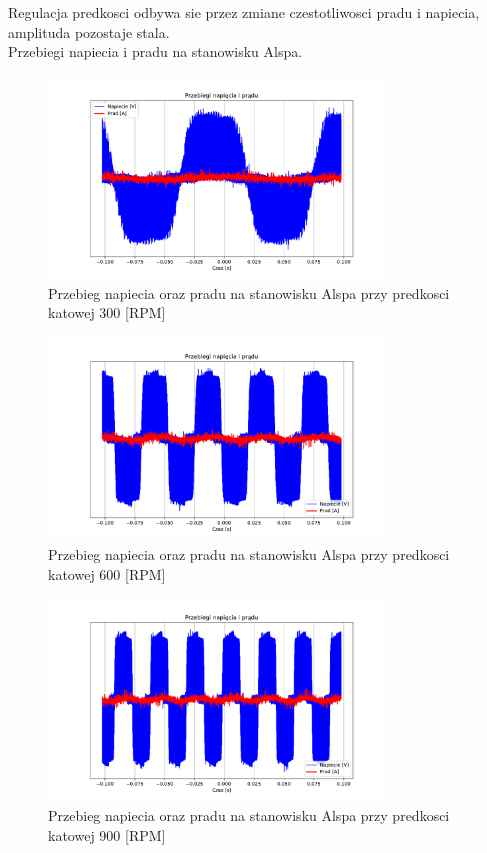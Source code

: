 \documentclass[11pt]{article}
\begin{document}
Regulacja predkosci odbywa sie przez zmiane czestotliwosci pradu i napiecia, amplituda pozostaje stala.\\

Przebiegi napiecia i pradu na stanowisku Alspa.\\

\begin{figure}[H]
\centering
\includegraphics[width=0.8\textwidth]{aun1_alspa_rpm300.pdf}
\caption{Przebieg napiecia oraz pradu na stanowisku Alspa przy predkosci katowej 300 [RPM]}
\end{figure}

\begin{figure}[H]
\centering
\includegraphics[width=0.8\textwidth]{aun1_alspa_rpm600.pdf}
\caption{Przebieg napiecia oraz pradu na stanowisku Alspa przy predkosci katowej 600 [RPM]}
\end{figure}

\begin{figure}[H]
\centering
\includegraphics[width=0.8\textwidth]{aun1_alspa_rpm900.pdf}
\caption{Przebieg napiecia oraz pradu na stanowisku Alspa przy predkosci katowej 900 [RPM]}
\end{figure}
\end{document}
